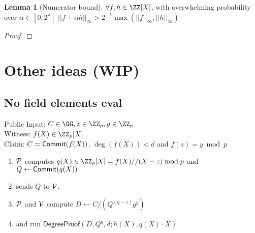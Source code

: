 \documentclass{article}
\theoremstyle{definition}
\newtheorem{lemma}{Lemma}
\begin{document}
\begin{lemma}[Numerator bound]
$\forall f,h \in \ZZ[X]$, with overwhelming probability over $\alpha \in [0,2^\lambda]$ $||f+\alpha h||_\infty >2^{-\lambda} \max(||f||_\infty,||h||_\infty)$
	
\end{lemma}
\begin{proof}
	
\end{proof}


\section{Other ideas (WIP)}
\subsection{No field elements eval}


\begin{mdframed}
Public Input: $C\in \GG,z\in \ZZ_p,y\in \ZZ_p$\\
Witness: $f(X) \in \ZZ_p[X]$ \\
Claim: $C=\textsf{{Commit}}(f(X))$, $\deg(f(X))<d$ and $f(z)=y \bmod p$
	\begin{enumerate}[nolistsep]
		\item $\mathcal{P}$ computes $q(X) \in \ZZ_p[X]=f(X)//(X-z) \bmod p$ and $Q\gets\textsf{{Commit}}(q(X))$
		\item \prover sends $Q$ to $\mathcal{V}$.
		\item $\mathcal{P}$ and $\mathcal{V}$ compute $D\gets C/(Q^{(q-z)}g^y)$ 

		\item \prover and \verifier run $\textsf{DegreeProof}(D,Q^q,d;h(X),q(X)\cdot X)$
	\end{enumerate}
\end{mdframed}
\end{document}
